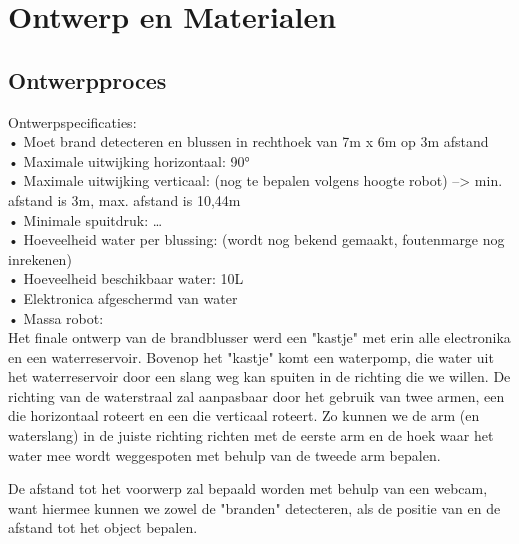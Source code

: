 \documentclass[kulak]{kulakarticle} %
\begin{document}
	
	\section{Ontwerp en Materialen}
	\subsection{Ontwerpproces}
	
		Ontwerpspecificaties: \\
	•	Moet brand detecteren en blussen in rechthoek van 7m x 6m op 3m afstand \\
	•	Maximale uitwijking horizontaal: 90°  \\
	•	Maximale uitwijking verticaal: (nog te bepalen volgens hoogte robot) --> min. afstand is 3m, max. afstand is 10,44m \\
	•	Minimale spuitdruk: … \\
	•	Hoeveelheid water per blussing: (wordt nog bekend gemaakt, foutenmarge nog inrekenen) \\
	•	Hoeveelheid beschikbaar water: 10L \\
	•	Elektronica afgeschermd van water \\
	•	Massa robot: \\
	
	
	Het finale ontwerp van de brandblusser werd een "kastje" met erin alle electronika en een waterreservoir. Bovenop het "kastje" komt een waterpomp, die water uit het waterreservoir door een slang weg kan spuiten in de richting die we willen. De richting van de waterstraal zal aanpasbaar door het gebruik van twee armen, een die horizontaal roteert en een die verticaal roteert. Zo kunnen we de arm (en waterslang) in de juiste richting richten met de eerste arm en de hoek waar het water mee wordt weggespoten met behulp van de tweede arm bepalen. 
	
	De afstand tot het voorwerp zal bepaald worden met behulp van een webcam, want hiermee kunnen we zowel de "branden" detecteren, als de positie van en de afstand tot het object bepalen.
	
\end{document}
